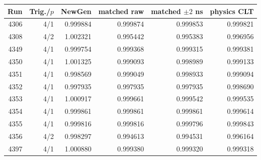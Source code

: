 \begin{tabular}{rrrrrr}\toprule Run & Trig./$p$ & NewGen & matched raw & matched $\pm2$ ns & physics CLT\\\midrule
4306 & 4/1 & 0.999884 & 0.999874 & 0.999853 & 0.999821\\
4308 & 4/2 & 1.002321 & 0.995442 & 0.995383 & 0.996956\\
4349 & 4/1 & 0.999754 & 0.999368 & 0.999315 & 0.999381\\
4350 & 4/1 & 1.001325 & 0.999093 & 0.998989 & 0.999133\\
4351 & 4/1 & 0.998569 & 0.999049 & 0.998933 & 0.999094\\
4352 & 4/1 & 0.997935 & 0.997935 & 0.997935 & 0.998690\\
4353 & 4/1 & 1.000917 & 0.999661 & 0.999542 & 0.999535\\
4354 & 4/1 & 0.999861 & 0.999861 & 0.999861 & 0.999614\\
4355 & 4/1 & 0.999816 & 0.999816 & 0.999796 & 0.999843\\
4356 & 4/2 & 0.998297 & 0.994613 & 0.994531 & 0.996164\\
4397 & 4/1 & 1.000880 & 0.999380 & 0.999320 & 0.999318\\
\bottomrule\end{tabular}